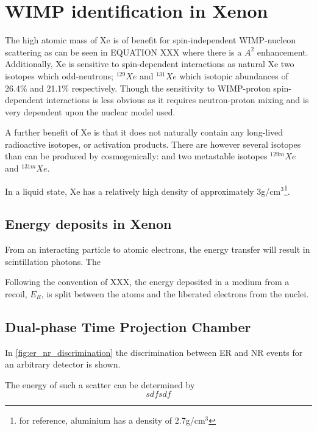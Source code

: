\section{WIMP identification in Xenon}
\label{sec:wimps_with_xenon}

\par
The high atomic mass of Xe is of benefit for spin-independent WIMP-nucleon scattering as can be seen in EQUATION XXX where there is a $A^2$ enhancement.
Additionally, Xe is sensitive to spin-dependent interactions as natural Xe two isotopes which odd-neutrons; ${}^{129}Xe$ and ${}^{131}Xe$ which isotopic abundances of 26.4\% and 21.1\% respectively.
Though the sensitivity to WIMP-proton spin-dependent interactions is less obvious as it requires neutron-proton mixing and is very dependent upon the nuclear model used.

\par
A further benefit of Xe is that it does not naturally contain any long-lived radioactive isotopes, or activation products.
There are however several isotopes than can be produced by cosmogenically: and two metastable isotopes ${}^{129m}Xe$ and ${}^{131m}Xe$.


\par
In a liquid state, Xe has a relatively high density of approximately 3g/cm${}^{3}$\footnote{for reference, aluminium has a density of 2.7g/cm${}^{3}$}.



\subsection{Energy deposits in Xenon}
\par
From an interacting particle to atomic electrons, the energy transfer will result in scintillation photons.
The 



Following the convention of XXX, the energy deposited in a medium from a recoil, $E_R$, is split between the atoms and the liberated electrons from the nuclei. 

\subsection{Dual-phase Time Projection Chamber}
\par


\par
In \autoref{fig:er_nr_discrimination} the discrimination between ER and NR events for an arbitrary detector is shown.



\par
The energy of such a scatter can be determined by 
\begin{equation}
sdfsdf    
\end{equation}
